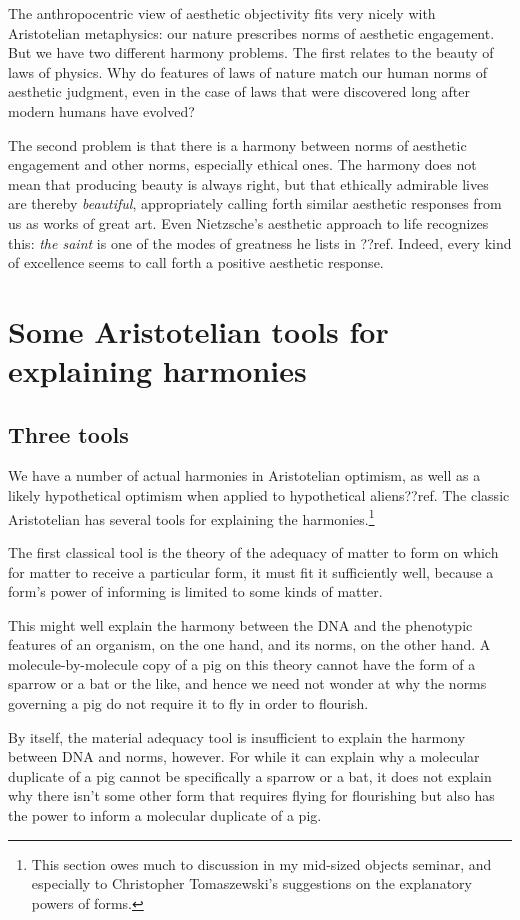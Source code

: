 The anthropocentric view of aesthetic objectivity fits very nicely with Aristotelian metaphysics: our
nature prescribes norms of aesthetic engagement. But we have two different harmony problems. The first relates
to the beauty of laws of physics. Why do features of laws of nature match our human norms of aesthetic 
judgment, even in the case of laws that were discovered long after modern humans have evolved? 

The second problem is that there is a harmony between norms of aesthetic engagement and other norms, especially 
ethical ones. The harmony does not mean that producing beauty is always right, but that ethically admirable lives are thereby
\textit{beautiful}, appropriately calling forth similar aesthetic responses from us as works of great art. 
Even Nietzsche's aesthetic approach to life recognizes this: \textit{the saint} is one of the modes of greatness
he lists in ??ref. Indeed, every kind of excellence seems to call forth a positive aesthetic response.

\section{Some Aristotelian tools for explaining harmonies}
\subsection{Three tools}
We have a number of actual harmonies in Aristotelian optimism, as well as a likely hypothetical optimism when
applied to hypothetical aliens??ref. The classic Aristotelian has several tools for explaining the harmonies.\footnote{This section owes much to discussion in my mid-sized objects seminar, and especially to Christopher Tomaszewski's suggestions on the explanatory powers of forms.}

The first classical tool is the theory of the adequacy of matter to form on which for matter to receive a particular 
form, it must fit it sufficiently well, because a form's power of informing is limited to some kinds of matter. 

This might well explain the harmony between the DNA and the phenotypic features of an organism, on the one hand, 
and its norms, on the other hand. A molecule-by-molecule copy of a pig on this theory cannot have the form of a sparrow or 
a bat or the like, and hence we need not wonder at why the norms governing a pig do not require it to fly in order to flourish.

By itself, the material adequacy tool is insufficient to explain the harmony between DNA and norms, however. For while 
it can explain why a molecular duplicate of a pig cannot be specifically a sparrow or a bat, it does not explain why there 
isn't some other form that requires flying for flourishing but also has the power to inform a molecular duplicate of a pig.

